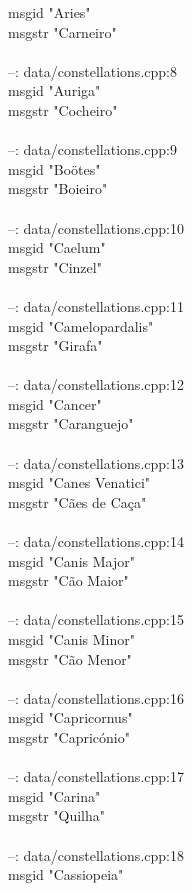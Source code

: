 \documentclass[10pt]{article}
\begin{document}
msgid "Aries"\\
msgstr "Carneiro"\\
\\
--: data/constellations.cpp:8\\
msgid "Auriga"\\
msgstr "Cocheiro"\\
\\
--: data/constellations.cpp:9\\
msgid "Boötes"\\
msgstr "Boieiro"\\
\\
--: data/constellations.cpp:10\\
msgid "Caelum"\\
msgstr "Cinzel"\\
\\
--: data/constellations.cpp:11\\
msgid "Camelopardalis"\\
msgstr "Girafa"\\
\\
--: data/constellations.cpp:12\\
msgid "Cancer"\\
msgstr "Caranguejo"\\
\\
--: data/constellations.cpp:13\\
msgid "Canes Venatici"\\
msgstr "Cães de Caça"\\
\\
--: data/constellations.cpp:14\\
msgid "Canis Major"\\
msgstr "Cão Maior"\\
\\
--: data/constellations.cpp:15\\
msgid "Canis Minor"\\
msgstr "Cão Menor"\\
\\
--: data/constellations.cpp:16\\
msgid "Capricornus"\\
msgstr "Capricónio"\\
\\
--: data/constellations.cpp:17\\
msgid "Carina"\\
msgstr "Quilha"\\
\\
--: data/constellations.cpp:18\\
msgid "Cassiopeia"\\
\end{document}
